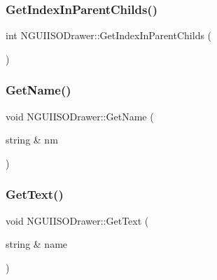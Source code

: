 \hypertarget{class_n_g_u_i_i_s_o_drawer_a6daf3194c80a33809510911d2d630c34}{}\label{class_n_g_u_i_i_s_o_drawer_a6daf3194c80a33809510911d2d630c34} 
\subsubsection{\texorpdfstring{Get\+Index\+In\+Parent\+Childs()}{GetIndexInParentChilds()}}
{\footnotesize\ttfamily int N\+G\+U\+I\+I\+S\+O\+Drawer\+::\+Get\+Index\+In\+Parent\+Childs (\begin{DoxyParamCaption}{ }\end{DoxyParamCaption})}

\hypertarget{class_n_g_u_i_i_s_o_drawer_a6ed5312dc652b39020c768776b3bd3fa}{}\label{class_n_g_u_i_i_s_o_drawer_a6ed5312dc652b39020c768776b3bd3fa} 
\subsubsection{\texorpdfstring{Get\+Name()}{GetName()}}
{\footnotesize\ttfamily void N\+G\+U\+I\+I\+S\+O\+Drawer\+::\+Get\+Name (\begin{DoxyParamCaption}\item[{string \&}]{nm }\end{DoxyParamCaption})}

\hypertarget{class_n_g_u_i_i_s_o_drawer_a5872b67e88fc63d235105be262a36aeb}{}\label{class_n_g_u_i_i_s_o_drawer_a5872b67e88fc63d235105be262a36aeb} 
\subsubsection{\texorpdfstring{Get\+Text()}{GetText()}}
{\footnotesize\ttfamily void N\+G\+U\+I\+I\+S\+O\+Drawer\+::\+Get\+Text (\begin{DoxyParamCaption}\item[{string \&}]{name }\end{DoxyParamCaption})}

